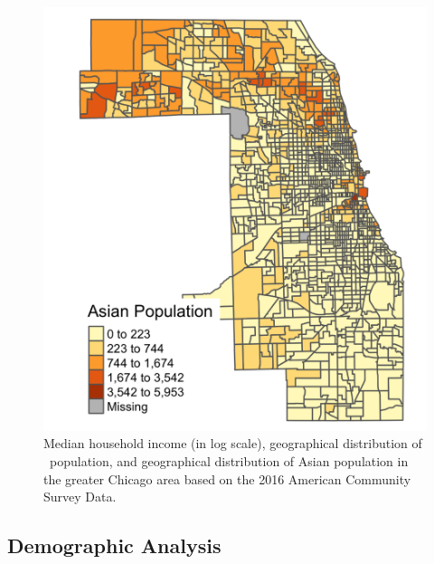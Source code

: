 \begin{figure}[!h]
\begin{center}
\includegraphics[scale=0.13]{pics/asian-census.png}

\caption{Median household income (in log scale), geographical distribution of \aam \ population, and geographical distribution of Asian population in the greater Chicago area based on the  2016  American Community Survey Data.}
\label{fig:census}
\end{center}
\end{figure}

\subsection{Demographic Analysis}

